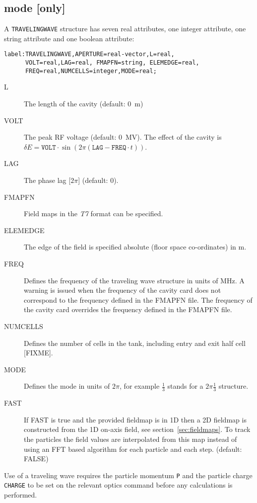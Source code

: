 \subsection{\opalt mode [only]}
A \texttt{TRAVELINGWAVE} structure has seven real attributes, one integer attribute, one string attribute and one boolean attribute:
\begin{verbatim}
label:TRAVELINGWAVE,APERTURE=real-vector,L=real,
      VOLT=real,LAG=real, FMAPFN=string, ELEMEDGE=real,
      FREQ=real,NUMCELLS=integer,MODE=real;
\end{verbatim}
\begin{description}
\item[L]
  The length of the cavity (default: 0~m)
\item[VOLT]
  The peak RF voltage (default: 0~MV).
  The effect of the cavity is
  $\delta E=\mathtt{VOLT}\cdot\sin(2\pi(\mathtt{LAG}- \mathtt{FREQ}\cdot t))$.
\item[LAG]
  The phase lag [$2\pi$] (default: 0).
\item[FMAPFN]
  Field maps in the {\em T7} format can be specified.
\item[ELEMEDGE]
  The edge of the field is specified absolute (floor space co-ordinates) in m.
  \item[FREQ]
  Defines the frequency of the traveling wave structure in units of MHz. A warning is issued when the frequency of
  the cavity card does not correspond to the frequency defined in the   FMAPFN file. The  frequency of
  the cavity card overrides the  frequency defined in the  FMAPFN file.
 \item[NUMCELLS]
Defines the number of cells in the tank, including entry and exit half cell [FIXME].
 \item[MODE]
Defines the mode in units of $2\pi$, for example $\frac{1}{3}$ stands for a $2\pi\frac{1}{3}$ structure.
\item[FAST]
If FAST is true and the provided fieldmap is in 1D then a 2D fieldmap is constructed from the 1D on-axis field, see section~\ref{sec:fieldmaps}. To track the particles the field values are interpolated from this map instead of using an FFT based algorithm for each particle and each step. (default: FALSE)
\end{description}
Use of a traveling wave requires the particle momentum \texttt{P}
and the particle charge \texttt{CHARGE} to be set on the relevant 
optics command before any calculations is performed.

